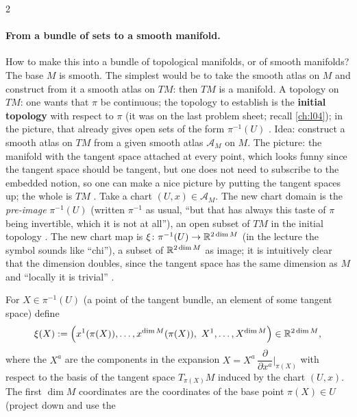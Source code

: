 \begin{paracol}{2}
\paragraph{From a bundle of sets to a smooth manifold.} How to make this into a bundle of topological manifolds, or of smooth manifolds? The base $M$ is smooth. The simplest would be to take the smooth atlas on $M$ and construct from it a smooth atlas on $TM$: then $TM$ is a manifold. A topology on $TM$: one wants that $\pi$ be continuous; the topology to establish is the
\textbf{initial topology} with respect to $\pi$ (it was on the last problem sheet; recall \cref{ch:l04}); in the picture, that already gives open sets of the form $\pi^{-1}(U)$      .
Idea: construct a smooth atlas on $TM$ from a given smooth atlas $\mathcal A_M$ on $M$. The picture: the manifold with the tangent space attached at every point, which looks funny since the tangent space should be tangent, but one does not need to subscribe to the embedded notion, so one can make a nice picture by putting the tangent spaces up; the whole is $TM$
  .
Take a chart $(U,x)\in\mathcal A_M$. The new chart domain is the \emph{pre-image} $\pi^{-1}(U)$ (written $\pi^{-1}$ as usual, ``but that has always this taste of $\pi$ being invertible, which it is not at all''), an open subset of $TM$ in the initial topology      .
The new chart map is $\xi\colon\pi^{-1}(U)\to\mathbb{R}^{2\dim M}$ (in the lecture the symbol sounds like ``chi''), a subset of $\mathbb{R}^{2\dim M}$ as image; it is intuitively clear that the dimension doubles, since the tangent space has the same dimension as $M$ and ``locally it is trivial''     .
\begin{definition}\label{def:tb-chart}
For $X\in\pi^{-1}(U)$ (a point of the tangent bundle, an element of some tangent space) define
\[
  \xi(X):=\Bigl(x^1(\pi(X)),\dots,x^{\dim M}(\pi(X)),\ X^1,\dots,X^{\dim M}\Bigr)\in\mathbb{R}^{2\dim M},
\]
where the $X^a$ are the components in the expansion $X=X^a\,\dfrac{\partial}{\partial x^a}\Big|_{\pi(X)}$ with respect to the basis of the tangent space $T_{\pi(X)}M$ induced by the chart $(U,x)$. The first $\dim M$ coordinates are the coordinates of the base point $\pi(X)\in U$ (project down and use the

\end{definition}
\end{paracol}
